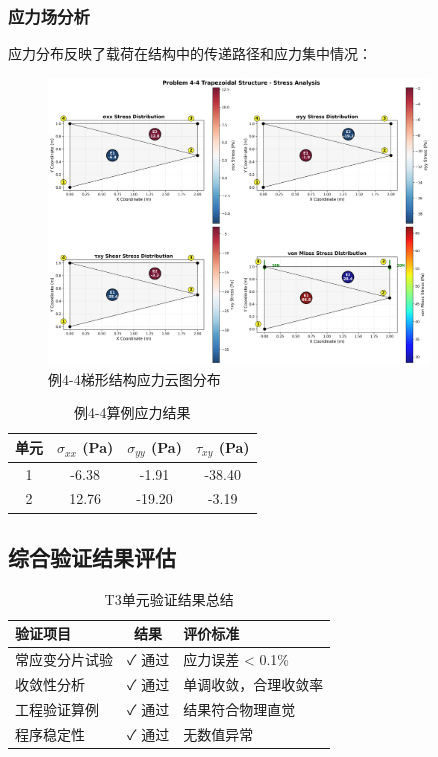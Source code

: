 \documentclass[12pt,a4paper]{article}
\begin{document}
\subsubsection{应力场分析}

应力分布反映了载荷在结构中的传递路径和应力集中情况：

\begin{figure}[H]
\centering
\includegraphics[width=0.9\textwidth]{img/wzy_stress_analysis.png}
\caption{例4-4梯形结构应力云图分布}
\label{fig:wzy_stress}
\end{figure}

\begin{table}[H]
\centering
\caption{例4-4算例应力结果}
\begin{tabular}{cccc}
\toprule
单元 & $\sigma_{xx}$ (Pa) & $\sigma_{yy}$ (Pa) & $\tau_{xy}$ (Pa) \\
\midrule
1 & -6.38 & -1.91 & -38.40 \\
2 & 12.76 & -19.20 & -3.19 \\
\bottomrule
\end{tabular}
\end{table}

\subsection{综合验证结果评估}

\begin{table}[H]
\centering
\caption{T3单元验证结果总结}
\begin{tabular}{lcl}
\toprule
验证项目 & 结果 & 评价标准 \\
\midrule
常应变分片试验 & ✓ 通过 & 应力误差 < 0.1\% \\
收敛性分析 & ✓ 通过 & 单调收敛，合理收敛率 \\
工程验证算例 & ✓ 通过 & 结果符合物理直觉 \\
程序稳定性 & ✓ 通过 & 无数值异常 \\
\bottomrule
\end{tabular}
\end{table}
\end{document}
